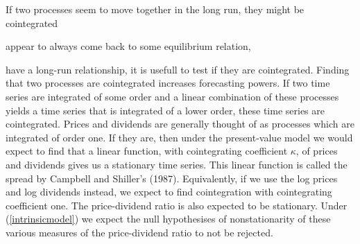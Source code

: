 \documentclass{article}
\begin{document}
If two processes seem to move together in the long run, they might be cointegrated

appear to always come back to some equilibrium relation,

 have a long-run relationship, it is usefull to test if they are cointegrated. Finding that two processes are cointegrated increases forecasting powers. If two time series are integrated of some order and a linear combination of these processes yields a time series that is integrated of a lower order, these time series are cointegrated. Prices and dividends are generally thought of as processes which are integrated of order one. If they are, then under the present-value model we would expect to find that a linear function, with cointegrating coefficient $\kappa$, of prices and dividends gives us a stationary time series. This linear function is called the spread by Campbell and Shiller's (1987). Equivalently, if we use the log prices and log dividends instead, we expect to find cointegration with cointegrating coefficient one. The price-dividend ratio is also expected to be stationary. Under (\ref{intrinsicmodel})  we expect the null hypothesises of nonstationarity of these various measures of the price-dividend ratio to not be rejected. 
\end{document}
